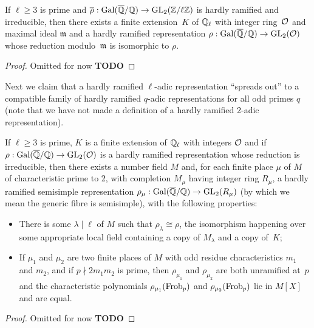 \begin{theorem}
  \label{hardly_ramified_lifts}
  \leanok
  If $\ell\geq3$ is prime and $\overline{\rho}:\operatorname{Gal}(\overline{\mathbb{Q}}/\mathbb{Q})\to\operatorname{GL}_2(\mathbb{Z}/\ell\mathbb{Z})$
  is hardly ramified and irreducible, then there exists a finite extension~$K$ of $\mathbb{Q}_\ell$
  with integer ring~$\mathcal{O}$ and maximal ideal $\mathfrak{m}$
  and a hardly ramified representation
  $\rho:\operatorname{Gal}(\overline{\mathbb{Q}}/\mathbb{Q})\to\operatorname{GL}_2(\mathcal{O})$ whose reduction modulo~$\mathfrak{m}$ is isomorphic to $\rho$.
\end{theorem}
\begin{proof}
  Omitted for now {\bf TODO}
\end{proof}

Next we claim that a hardly ramified $\ell$-adic representation ``spreads out'' to a compatible
family of hardly ramified $q$-adic representations for all odd primes $q$ (note that we have
not made a definition of a hardly ramified 2-adic representation).

\begin{theorem}
  \label{hardly_ramified_spreads_out}
  \leanok
  If $\ell\geq3$ is prime, $K$ is a finite extension of $\mathbb{Q}_\ell$
  with integers $\mathcal{O}$ and if $\rho:\operatorname{Gal}(\overline{\mathbb{Q}}/\mathbb{Q})\to\operatorname{GL}_2(\mathcal{O})$ is a hardly ramified representation
  whose reduction is irreducible,
  then there exists a number field $M$ and, for each finite place $\mu$ of $M$
  of characteristic prime to 2, with completion $M_\mu$ having integer ring $R_\mu$,
  a hardly ramified semisimple representation $\rho_\mu:\operatorname{Gal}(\overline{\mathbb{Q}}/\mathbb{Q})\to\operatorname{GL}_2(R_\mu)$ (by which we
  mean the generic fibre is semisimple), with the following properties:
  \begin{itemize}
    \item There is some $\lambda\mid\ell$ of $M$ such that $\rho_\lambda\cong\rho$,
      the isomorphism happening over some appropriate local field containing a copy
      of $M_\lambda$ and a copy of~$K$;
    \item If $\mu_1$ and $\mu_2$ are two finite places of $M$ with odd residue characteristics $m_1$
      and $m_2$, and if $p\nmid 2m_1m_2$ is prime, then $\rho_{\mu_1}$ and $\rho_{\mu_2}$
      are both unramified at~$p$ and the characteristic polynomials $\rho_{\mu_1}(\operatorname{Frob}_p)$
      and $\rho_{\mu_2}(\operatorname{Frob}_p)$ lie in $M[X]$ and are equal.
  \end{itemize}
\end{theorem}
\begin{proof}
  Omitted for now {\bf TODO}
\end{proof}


